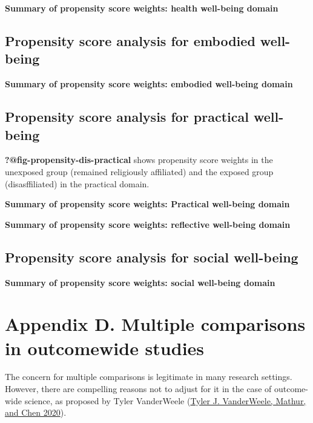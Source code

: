 \documentclass[
  singlecolumn]{report}
\begin{document}
\textbf{Summary of propensity score weights: health well-being domain}

\hypertarget{propensity-score-analysis-for-embodied-well-being}{%
\subsection{Propensity score analysis for embodied
well-being}\label{propensity-score-analysis-for-embodied-well-being}}

\textbf{Summary of propensity score weights: embodied well-being domain}

\hypertarget{propensity-score-analysis-for-practical-well-being}{%
\subsection{Propensity score analysis for practical
well-being}\label{propensity-score-analysis-for-practical-well-being}}

\textbf{?@fig-propensity-dis-practical} shows propensity score weights
in the unexposed group (remained religiously affiliated) and the exposed
group (disasffiliated) in the practical domain.

\textbf{Summary of propensity score weights: Practical well-being
domain}

\textbf{Summary of propensity score weights: reflective well-being
domain}

\hypertarget{propensity-score-analysis-for-social-well-being}{%
\subsection{Propensity score analysis for social
well-being}\label{propensity-score-analysis-for-social-well-being}}

\textbf{Summary of propensity score weights: social well-being domain}

\newpage{}

\hypertarget{appendix-d.-multiple-comparisons-in-outcomewide-studies}{%
\section{Appendix D. Multiple comparisons in outcomewide
studies}\label{appendix-d.-multiple-comparisons-in-outcomewide-studies}}

The concern for multiple comparisons is legitimate in many research
settings. However, there are compelling reasons not to adjust for it in
the case of outcome-wide science, as proposed by Tyler VanderWeele
(\protect\hyperlink{ref-vanderweele2020}{Tyler J. VanderWeele, Mathur,
and Chen 2020}).
\end{document}
